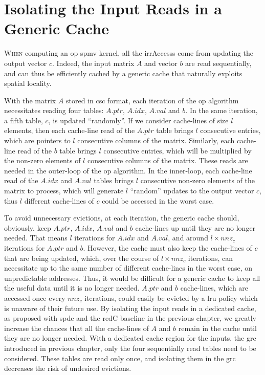 
\section{Isolating the Input Reads in a Generic Cache}
\label{sec:theory:isolate_input_reads}

\lettrine{W}{hen} computing an \acrshort{op} \acrshort{spmv} kernel, all the \glspl{irrAccess} come from updating the output vector $c$.
Indeed, the input matrix $A$ and vector $b$ are read sequentially, and can thus be efficiently cached by a generic cache that naturally exploits spatial locality.

With the matrix $A$ stored in \acrshort{csc} format, each iteration of the \acrshort{op} algorithm necessitates reading four tables: $\mathit{A.ptr}$, $\mathit{A.idx}$, $\mathit{A.val}$ and $b$.
In the same iteration, a fifth table, $c$, is updated ``randomly''.
If we consider cache-lines of size $l$ elements, then each cache-line read of the $\mathit{A.ptr}$ table brings $l$ consecutive entries, which are pointers to $l$ consecutive columns of the matrix.
Similarly, each cache-line read of the $b$ table brings $l$ consecutive entries, which will be multiplied by the non-zero elements of $l$ consecutive columns of the matrix.
These reads are needed in the outer-loop of the \acrshort{op} algorithm.
In the inner-loop, each cache-line read of the $\mathit{A.idx}$ and $\mathit{A.val}$ tables brings $l$ consecutive non-zero elements of the matrix to process, which will generate $l$ ``random'' updates to the output vector $c$, thus $l$ different cache-lines of $c$ could be accessed in the worst case.

To avoid unnecessary \glspl{eviction}, at each iteration, the generic cache should, obviously, keep $\mathit{A.ptr}$, $\mathit{A.idx}$, $\mathit{A.val}$ and $b$ cache-lines up until they are no longer needed.
That means $l$ iterations for $\mathit{A.idx}$ and $\mathit{A.val}$, and around $l \times \mathit{nnz}_c$ iterations for $\mathit{A.ptr}$ and $b$.
However, the cache must also keep the cache-lines of $c$ that are being updated, which, over the course of $l \times \mathit{nnz}_c$ iterations, can necessitate up to the same number of different cache-lines in the worst case, on unpredictable addresses.
Thus, it would be difficult for a generic cache to keep all the useful data until it is no longer needed.
$\mathit{A.ptr}$ and $b$ cache-lines, which are accessed once every $\mathit{nnz}_c$ iterations, could easily be evicted by a \acrshort{lru} policy which is unaware of their future use.
By isolating the input reads in a dedicated cache, as proposed with \acrlong{spdc} and the \gls{redC} baseline in the previous chapter, we greatly increase the chances that all the cache-lines of $A$ and $b$ remain in the cache until they are no longer needed.
With a dedicated cache region for the inputs, the \acrshort{grc} introduced in previous chapter, only the four sequentially read tables need to be considered.
These tables are read only once, and isolating them in the \acrshort{grc} decreases the risk of undesired \glspl{eviction}.


